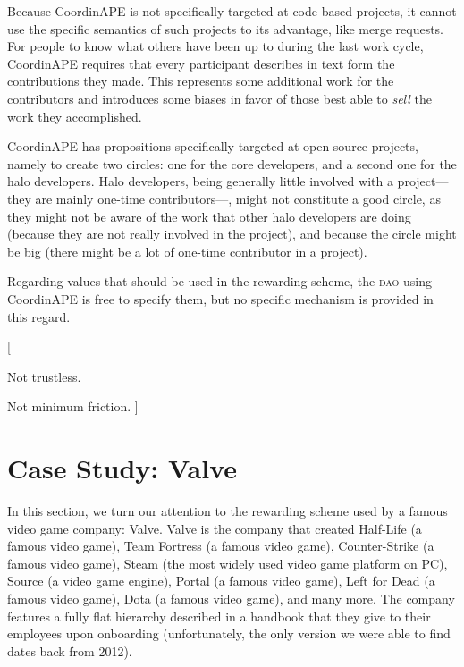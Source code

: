 %
Because CoordinAPE is not specifically targeted at code-based projects, it cannot use the specific semantics of such projects to its advantage, like merge requests.
For people to know what others have been up to during the last work cycle, CoordinAPE requires that every participant describes in text form the contributions they made.
This represents some additional work for the contributors and introduces some biases in favor of those best able to \emph{sell} the work they accomplished.

CoordinAPE has propositions specifically targeted at open source projects, namely to create two circles: one for the core developers, and a second one for the halo developers.
Halo developers, being generally little involved with a project---they are mainly one-time contributors---, might not constitute a good circle, as they might not be aware of the work that other halo developers are doing (because they are not really involved in the project), and because the circle might be big (there might be a lot of one-time contributor in a project).

Regarding values that should be used in the rewarding scheme, the \textsc{dao} using CoordinAPE is free to specify them, but no specific mechanism is provided in this regard.

[%
  \item Not trustless.
  \item Not minimum friction.
]

\section{Case Study: Valve}

In this section, we turn our attention to the rewarding scheme used by a famous video game company: Valve.
Valve is the company that created Half-Life (a famous video game), Team Fortress (a famous video game), Counter-Strike (a famous video game), Steam (the most widely used video game platform on PC), Source (a video game engine), Portal (a famous video game), Left for Dead (a famous video game), Dota (a famous video game), and many more.
The company features a fully flat hierarchy described in a handbook \cite{valve_valve_2012} that they give to their employees upon onboarding (unfortunately, the only version we were able to find dates back from 2012).

